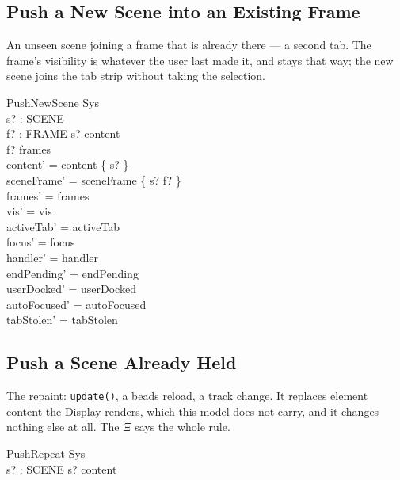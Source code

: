\documentclass[a4paper,10pt,fleqn]{article}
\begin{document}
\subsection{Push a New Scene into an Existing Frame}

An unseen scene joining a frame that is already there --- a second tab.  The
frame's visibility is whatever the user last made it, and stays that way; the
new scene joins the tab strip without taking the selection.

\begin{schema}{PushNewScene}
  \Delta Sys \\
  s? : SCENE \\
  f? : FRAME
\where
  s? \notin content \\
  f? \in frames \\
  content' = content \cup \{ s? \} \\
  sceneFrame' = sceneFrame \cup \{ s? \mapsto f? \} \\
  frames' = frames \\
  vis' = vis \\
  activeTab' = activeTab \\
  focus' = focus \\
  handler' = handler \\
  endPending' = endPending \\
  userDocked' = userDocked \\
  autoFocused' = autoFocused \\
  tabStolen' = tabStolen
\end{schema}

\subsection{Push a Scene Already Held}

The repaint: \texttt{update()}, a beads reload, a track change.  It replaces
element content the Display renders, which this model does not carry, and it
changes nothing else at all.  The $\Xi$ says the whole rule.

\begin{schema}{PushRepeat}
  \Xi Sys \\
  s? : SCENE
\where
  s? \in content
\end{schema}
\end{document}
